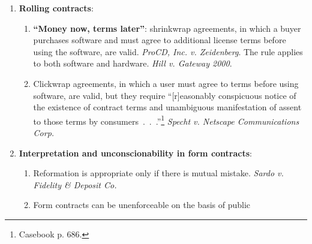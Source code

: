 \begin{enumerate}
\begin{enumerate}
\begin{enumerate}
            conditional.'' Some hold that that if acceptance is ``expressly 
            made conditional,'' it must be ``directly and distinctly 
            stated.''\footnote{Casebook p. 655.} Others apply looser 
            standards, e.g., requiring certain key phrases, or requiring the 
            offeree to demonstrate unwillingness to proceed unless he agrees 
            to the additional terms.
        \end{enumerate}
        \item \textbf{Knockout rule}: under 2-207, conflicting terms cancel 
        each other out.
        \item \textbf{``Materially alter''} under 2-207(2)(b): a term added in 
        an acceptance does not become part of the contract if it would 
        ``materially alter'' the contract. The UCC defines ``materially 
        alter'' to mean ``would result in [unreasonable] surprise or 
        hardship.'' So, for instance, a mandatory arbitration clause is not a 
        material alteration.\footnote{Casebook pp. 653--55.}
    \end{enumerate}
    \item \textbf{Rolling contracts}:
    \begin{enumerate}
        \item \textbf{``Money now, terms later''}: shrinkwrap agreements, in 
        which a buyer purchases software and must agree to additional license 
        terms before using the software, are valid. \emph{ProCD, Inc. v. 
        Zeidenberg}. The rule applies to both software and hardware. 
        \emph{Hill v. Gateway 2000}.
        \item Clickwrap agreements, in which a user must agree to terms before 
        using software, are valid, but they require ``[r]easonably conspicuous 
        notice of the existence of contract terms and unambiguous 
        manifestation of assent to those terms by 
        consumers~.~.~.''\footnote{Casebook p. 686.} \emph{Specht v. Netscape 
        Communications Corp.}
    \end{enumerate}
    \item \textbf{Interpretation and unconscionability in form contracts}:
    \begin{enumerate}
        \item Reformation is appropriate only if there is mutual mistake. 
        \emph{Sardo v. Fidelity \& Deposit Co.}
        \item Form contracts can be unenforceable on the basis of public 

\end{enumerate}
\end{enumerate}
